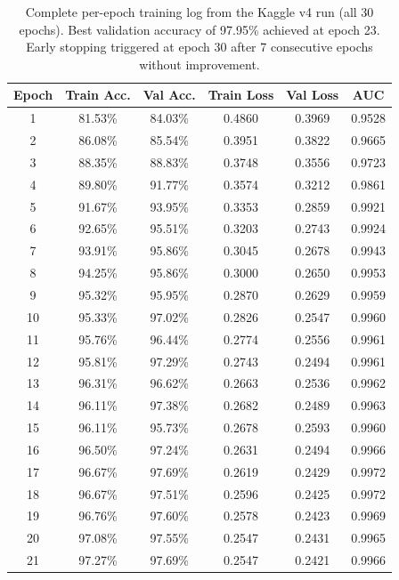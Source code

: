 \documentclass[12pt,a4paper,oneside]{report}
\begin{document}
\begin{table}[H]
\centering
\caption{Complete per-epoch training log from the Kaggle v4 run (all 30 epochs).
Best validation accuracy of 97.95\% achieved at epoch 23. Early stopping triggered
at epoch 30 after 7 consecutive epochs without improvement.}
\label{tab:curves_full}
\renewcommand{\arraystretch}{1.15}
\begin{tabular}{cccccc}
\toprule
\textbf{Epoch} & \textbf{Train Acc.} & \textbf{Val Acc.} &
\textbf{Train Loss} & \textbf{Val Loss} & \textbf{AUC} \\
\midrule
     1  & 81.53\% & 84.03\% & 0.4860 & 0.3969 & 0.9528 \\
     2  & 86.08\% & 85.54\% & 0.3951 & 0.3822 & 0.9665 \\
     3  & 88.35\% & 88.83\% & 0.3748 & 0.3556 & 0.9723 \\
     4  & 89.80\% & 91.77\% & 0.3574 & 0.3212 & 0.9861 \\
     5  & 91.67\% & 93.95\% & 0.3353 & 0.2859 & 0.9921 \\
     6  & 92.65\% & 95.51\% & 0.3203 & 0.2743 & 0.9924 \\
     7  & 93.91\% & 95.86\% & 0.3045 & 0.2678 & 0.9943 \\
     8  & 94.25\% & 95.86\% & 0.3000 & 0.2650 & 0.9953 \\
     9  & 95.32\% & 95.95\% & 0.2870 & 0.2629 & 0.9959 \\
    10  & 95.33\% & 97.02\% & 0.2826 & 0.2547 & 0.9960 \\
    11  & 95.76\% & 96.44\% & 0.2774 & 0.2556 & 0.9961 \\
    12  & 95.81\% & 97.29\% & 0.2743 & 0.2494 & 0.9961 \\
    13  & 96.31\% & 96.62\% & 0.2663 & 0.2536 & 0.9962 \\
    14  & 96.11\% & 97.38\% & 0.2682 & 0.2489 & 0.9963 \\
    15  & 96.11\% & 95.73\% & 0.2678 & 0.2593 & 0.9960 \\
    16  & 96.50\% & 97.24\% & 0.2631 & 0.2494 & 0.9966 \\
    17  & 96.67\% & 97.69\% & 0.2619 & 0.2429 & 0.9972 \\
    18  & 96.67\% & 97.51\% & 0.2596 & 0.2425 & 0.9972 \\
    19  & 96.76\% & 97.60\% & 0.2578 & 0.2423 & 0.9969 \\
    20  & 97.08\% & 97.55\% & 0.2547 & 0.2431 & 0.9965 \\
    21  & 97.27\% & 97.69\% & 0.2547 & 0.2421 & 0.9966 \\

\end{tabular}
\end{table}
\end{document}
